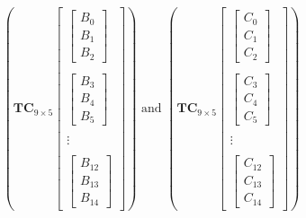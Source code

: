 \documentclass[
11pt,notheorems,hyperref={pdfauthor=whatever}
]{beamer}
\begin{document}
\begin{frame}
    \[
    \left(\mathbf{TC}_{9\times 5}
        \begin{bmatrix}
            \begin{bmatrix}
                B_{0} \\ B_{1} \\ B_{2} 
            \end{bmatrix} \\ \\
            \begin{bmatrix}
                B_{3} \\ B_{4} \\ B_{5}
            \end{bmatrix} \\ \\
            \vdots \\\\
            \begin{bmatrix}
                B_{12} \\ B_{13} \\ B_{14}
            \end{bmatrix}
        \end{bmatrix}\right)
        \text{ and }   
    \left(\mathbf{TC}_{9\times 5}
    \begin{bmatrix}
        \begin{bmatrix}
            C_{0} \\ C_{1} \\ C_{2} 
        \end{bmatrix} \\ \\
        \begin{bmatrix}
            C_{3} \\ C_{4} \\ C_{5}
        \end{bmatrix} \\ \\
        \vdots \\\\
        \begin{bmatrix}
            C_{12} \\ C_{13} \\ C_{14}
        \end{bmatrix}
    \end{bmatrix}\right)
    \]
\end{frame}
\end{document}
